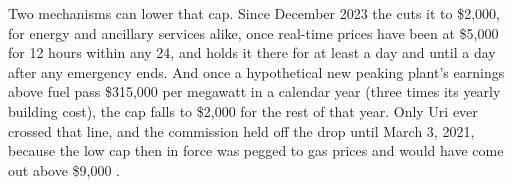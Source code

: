 Two mechanisms can lower that cap. Since December 2023 the  cuts it to \$2,000, for energy and ancillary services alike, once real-time prices have been at \$5,000 for 12 hours within any 24, and holds it there for at least a day and until a day after any emergency ends. And once a hypothetical new peaking plant's earnings above fuel pass \$315,000 per megawatt in a calendar year (three times its yearly building cost), the cap falls to \$2,000 for the rest of that year. Only Uri ever crossed that line, and the commission held off the drop until March 3, 2021, because the low cap then in force was pegged to gas prices and would have come out above \$9,000 \autocite{puct25509,ercot2026protocols,potomac2026somercot,potomac2021som}. %
